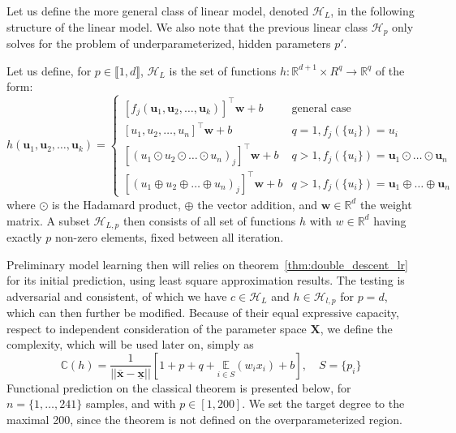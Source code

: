 \documentclass[10pt]{article} %
\begin{document}
Let us define the more general class of linear model, denoted $\mathcal{H}_{L}$, in the following structure of the linear model. We also note that the previous linear class $\mathcal{H}_{p}$ only solves for the problem of underparameterized, hidden parameters $p'$.

\begin{definition}
    Let us define, for $p\in\llbracket1,d\rrbracket$, $\mathcal{H}_{L}$ is the set of functions $h:\mathbb{R}^{d+1}\times R^{q}\to\mathbb{R}^{q}$ of the form: 
    \begin{equation}
        h(\mathbf{u}_{1},\mathbf{u}_{2},\dots,\mathbf{u}_{k}) =  \begin{cases}
            [f_{j}(\mathbf{u}_{1},\mathbf{u}_{2},\dots,\mathbf{u}_{k})]^{\top}\mathbf{w}+b & \text{general case}\\
            [u_{1},u_{2},\dots, u_{n}]^{\top}\mathbf{w} +b & q=1, f_{j}(\{u_{i}\}) = u_{i}\\
            [(u_{1}\odot u_{2}\odot\dots \odot  u_{n})_{j}]^{\top}\mathbf{w} +b & q > 1, f_{j}(\{u_{i}\}) = \mathbf{u}_{1}\odot\dots\odot \mathbf{u}_{n} \\
            [(u_{1}\oplus u_{2}\oplus\dots \oplus  u_{n})_{j}]^{\top}\mathbf{w} +b & q > 1, f_{j}(\{u_{i}\}) = \mathbf{u}_{1}\oplus\dots\oplus \mathbf{u}_{n}
        \end{cases}
    \end{equation}
    where $\odot$ is the Hadamard product, $\oplus$ the vector addition, and $\mathbf{w}\in \mathbb{R}^{d}$ the weight matrix. A subset $\mathcal{H}_{L,p}$ then consists of all set of functions $h$ with $w\in \mathbb{R}^{d}$ having exactly $p$ non-zero elements, fixed between all iteration. 
\end{definition}

Preliminary model learning then will relies on theorem~\ref{thm:double_descent_lr} for its initial prediction, using least square approximation results. The testing is adversarial and consistent, of which we have $c\in \mathcal{H}_{L}$ and $h\in \mathcal{H}_{l,p}$ for $p=d$, which can then further be modified. Because of their equal expressive capacity, respect to independent consideration of the parameter space $\mathbf{X}$, we define the complexity, which will be used later on, simply as \begin{equation}
    \mathbb{C}(h) = \frac{1}{||\overline{\mathbf{x}}-\underline{\mathbf{x}}||}\left[1+p + q + \underset{i\in S}{\mathbb{E}} (w_{i}x_{i})+b\right],\quad S = \{p_{i}\}
\end{equation}
Functional prediction on the classical theorem is presented below, for $n=\{1,\dots,241\}$ samples, and with $p\in[1,200]$. We set the target degree to the maximal 200, since the theorem is not defined on the overparameterized region. 
\end{document}

